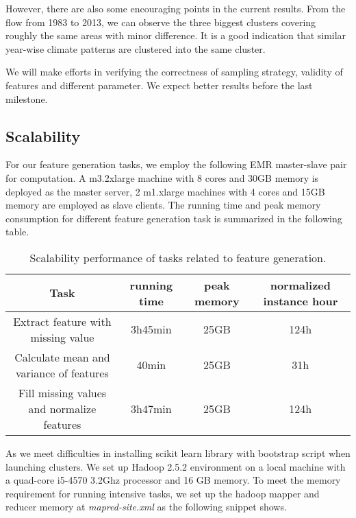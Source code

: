 However, there are also some encouraging points in the current results. From the flow from 1983 to 2013, we can observe the three biggest clusters covering roughly the same areas with minor difference. It is a good indication that similar year-wise climate patterns are clustered into the same cluster.

We will make efforts in verifying the correctness of sampling strategy, validity of features and different parameter. We expect better results before the last milestone.

\subsection{Scalability}
For our feature generation tasks, we employ the following EMR master-slave pair for computation. A m3.2xlarge machine with 8 cores and 30GB memory is deployed as the master server, 2 m1.xlarge machines with 4 cores and	15GB memory are employed as slave clients. The running time and peak memory consumption for different feature generation task is summarized in the following table.

\begin{table}[H]
    \begin{tabular}{| c | c | c | c |}
    \hline
    Task & running time & peak memory & normalized instance hour \\
    \hline
    \hline
    Extract feature with missing value & 3h45min & 25GB & 124h\\
    \hline
    Calculate mean and variance of features & 40min & 25GB & 31h\\
    \hline
    Fill missing values and normalize features & 3h47min & 25GB & 124h\\
    \hline
    \end{tabular}
    \caption{Scalability performance of tasks related to feature generation.}
    \label{tbl:PerfTable}
\end{table}

As we meet difficulties in installing scikit learn library with bootstrap script when launching clusters. We set up Hadoop 2.5.2 environment on a local machine with a quad-core i5-4570 3.2Ghz processor and 16 GB memory. To meet the memory requirement for running intensive tasks, we set up the hadoop mapper and reducer memory at \textit{mapred-site.xml } as the following snippet shows.


